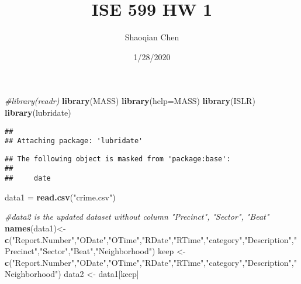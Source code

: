 \documentclass[]{article}
\title{ISE 599 HW 1}
\author{Shaoqian Chen}
\date{1/28/2020}
\newenvironment{Shaded}{\begin{snugshade}}{\end{snugshade}}
\newcommand{\CommentTok}[1]{\textcolor[rgb]{0.56,0.35,0.01}{\textit{#1}}}
\newcommand{\DataTypeTok}[1]{\textcolor[rgb]{0.13,0.29,0.53}{#1}}
\newcommand{\KeywordTok}[1]{\textcolor[rgb]{0.13,0.29,0.53}{\textbf{#1}}}
\newcommand{\NormalTok}[1]{#1}
\newcommand{\StringTok}[1]{\textcolor[rgb]{0.31,0.60,0.02}{#1}}
\begin{document}
\maketitle

\begin{Shaded}
\begin{Highlighting}[]
\CommentTok{#library(readr)}
\KeywordTok{library}\NormalTok{(MASS)}
\KeywordTok{library}\NormalTok{(}\DataTypeTok{help=}\NormalTok{MASS)}
\KeywordTok{library}\NormalTok{(ISLR)}
\KeywordTok{library}\NormalTok{(lubridate)}
\end{Highlighting}
\end{Shaded}

\begin{verbatim}
## 
## Attaching package: 'lubridate'
\end{verbatim}

\begin{verbatim}
## The following object is masked from 'package:base':
## 
##     date
\end{verbatim}

\begin{Shaded}
\begin{Highlighting}[]
\NormalTok{data1 =}\StringTok{ }\KeywordTok{read.csv}\NormalTok{(}\StringTok{"crime.csv"}\NormalTok{)}
\end{Highlighting}
\end{Shaded}

\begin{Shaded}
\begin{Highlighting}[]
\CommentTok{#data2 is the updated dataset without column "Precinct", "Sector", "Beat"}
\KeywordTok{names}\NormalTok{(data1)<-}\KeywordTok{c}\NormalTok{(}\StringTok{"Report.Number"}\NormalTok{,}\StringTok{"ODate"}\NormalTok{,}\StringTok{"OTime"}\NormalTok{,}\StringTok{"RDate"}\NormalTok{,}\StringTok{"RTime"}\NormalTok{,}\StringTok{"category"}\NormalTok{,}\StringTok{"Description"}\NormalTok{,}\StringTok{"Precinct"}\NormalTok{,}\StringTok{"Sector"}\NormalTok{,}\StringTok{"Beat"}\NormalTok{,}\StringTok{"Neighborhood"}\NormalTok{)}
\NormalTok{keep <-}\StringTok{ }\KeywordTok{c}\NormalTok{(}\StringTok{"Report.Number"}\NormalTok{,}\StringTok{"ODate"}\NormalTok{,}\StringTok{"OTime"}\NormalTok{,}\StringTok{"RDate"}\NormalTok{,}\StringTok{"RTime"}\NormalTok{,}\StringTok{"category"}\NormalTok{,}\StringTok{"Description"}\NormalTok{,}\StringTok{"Neighborhood"}\NormalTok{)}
\NormalTok{data2 <-}\StringTok{ }\NormalTok{data1[keep]}
\end{Highlighting}
\end{Shaded}
\end{document}
